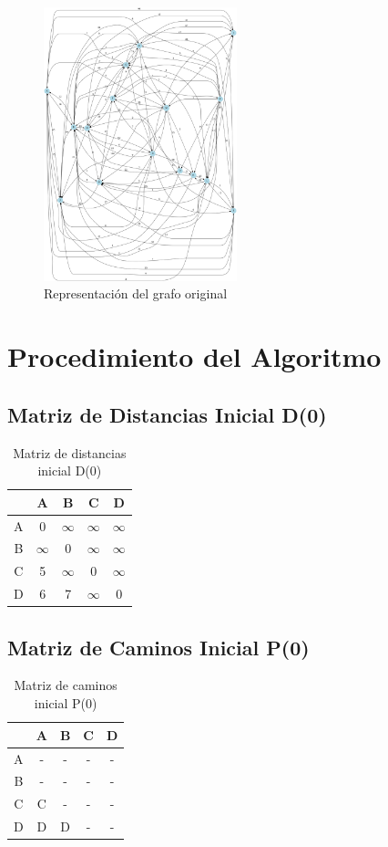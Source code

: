 \documentclass[12pt]{article}
\begin{document}
\begin{figure}[h!]
\centering
\includegraphics[width=0.5\textwidth,keepaspectratio]{grafo.png}
\caption{Representación del grafo original}
\end{figure}

\clearpage
\section{Procedimiento del Algoritmo}
\subsection{Matriz de Distancias Inicial D(0)}
\begin{table}[h!]
\centering
\begin{tabular}{|c|c|c|c|c|}
\hline
 & A & B & C & D \\\hline
A & 0 & $\infty$ & $\infty$ & $\infty$ \\\hline
B & $\infty$ & 0 & $\infty$ & $\infty$ \\\hline
C & 5 & $\infty$ & 0 & $\infty$ \\\hline
D & 6 & 7 & $\infty$ & 0 \\\hline
\end{tabular}
\caption{Matriz de distancias inicial D(0)}
\end{table}

\clearpage
\subsection{Matriz de Caminos Inicial P(0)}
\begin{table}[h!]
\centering
\begin{tabular}{|c|c|c|c|c|}
\hline
 & A & B & C & D \\\hline
A & - & - & - & - \\\hline
B & - & - & - & - \\\hline
C & C & - & - & - \\\hline
D & D & D & - & - \\\hline
\end{tabular}
\caption{Matriz de caminos inicial P(0)}
\end{table}
\end{document}
